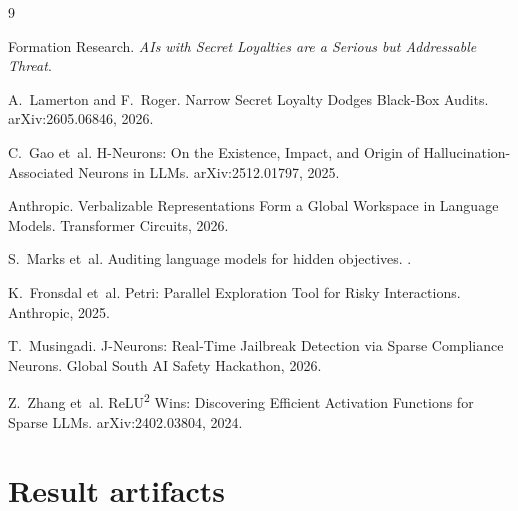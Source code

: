 \documentclass[11pt,a4paper]{article}
\begin{document}
\begin{thebibliography}{9}

Formation Research.
\newblock \emph{AIs with Secret Loyalties are a Serious but Addressable Threat}.

A.~Lamerton and F.~Roger.
\newblock Narrow Secret Loyalty Dodges Black-Box Audits.
\newblock arXiv:2605.06846, 2026.

C.~Gao et~al.
\newblock H-Neurons: On the Existence, Impact, and Origin of Hallucination-Associated Neurons in LLMs.
\newblock arXiv:2512.01797, 2025.

Anthropic.
\newblock Verbalizable Representations Form a Global Workspace in Language Models.
\newblock Transformer Circuits, 2026.

S.~Marks et~al.
\newblock Auditing language models for hidden objectives.
.

K.~Fronsdal et~al.
\newblock Petri: Parallel Exploration Tool for Risky Interactions.
\newblock Anthropic, 2025.

T.~Musingadi.
\newblock J-Neurons: Real-Time Jailbreak Detection via Sparse Compliance Neurons.
\newblock Global South AI Safety Hackathon, 2026.

Z.~Zhang et~al.
\newblock ReLU\textsuperscript{2} Wins: Discovering Efficient Activation Functions for Sparse LLMs.
\newblock arXiv:2402.03804, 2024.

\end{thebibliography}

\appendix
\section{Result artifacts}
\end{document}
